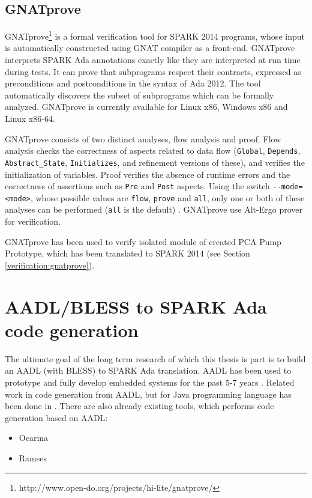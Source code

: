 \subsection{GNATprove}
\label{background:sparkverification:gnatprove}

GNATprove\footnote{http://www.open-do.org/projects/hi-lite/gnatprove/} is a formal verification tool for SPARK 2014 programs, whose input is automatically constructed using GNAT compiler as a front-end. GNATprove interprets SPARK Ada annotations exactly like they are interpreted at run time during tests. It can prove that subprograms respect their contracts, expressed as preconditions and postconditions in the syntax of Ada 2012. The tool automatically discovers the subset of subprograms which can be formally analyzed. GNATprove is currently available for Linux x86, Windows x86 and Linux x86-64.

GNATprove consists of two distinct analyses, flow analysis and proof. Flow analysis checks the correctness of aspects related to data flow (\lstinline{Global}, \lstinline{Depends}, \lstinline{Abstract_State}, \lstinline{Initializes}, and refinement versions of these), and verifies the initialization of variables. Proof verifies the absence of runtime errors and the correctness of assertions such as \lstinline{Pre} and \lstinline{Post} aspects. Using the switch \lstinline{--mode=<mode>}, whose possible values are \lstinline{flow}, \lstinline{prove} and \lstinline{all}, only one or both of these analyses can be performed (\lstinline{all} is the default) \cite{Spark2014userGuide:Online}. GNATprove use Alt-Ergo prover for verification.

GNATprove has been used to verify isolated module of created PCA Pump Prototype, which has been translated to SPARK 2014 (see Section \ref{verification:gnatprove}).



\section{AADL/BLESS to SPARK Ada code generation}
\label{background:codegen}

The ultimate goal of the long term research of which this thesis is part is to build an AADL (with BLESS) to SPARK Ada translation. AADL has been used to prototype and fully develop embedded systems for the past 5-7 years \cite{PrototypyingAadl:Paper}. Related work in code generation from AADL, but for Java programming language has been done in \cite{MAP:Paper}. There are also already existing tools, which performs code generation based on AADL:
\begin{itemize} %
	\item Ocarina
	\item Ramses
\end{itemize}



